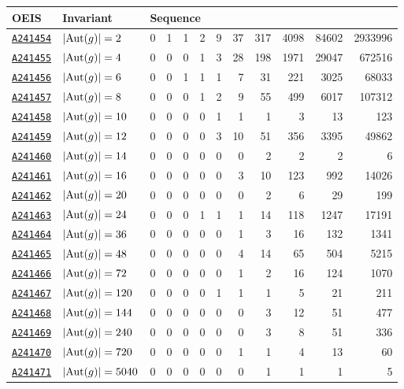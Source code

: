 \documentclass[12pt]{article}
\newcommand{\OEIS}[1]
{\href{https://oeis.org/#1}{\texttt{#1}}}
\begin{document}
\begin{appendices}
\begin{longtable}{ l l r r r r r r r r r r}
\toprule
OEIS & Invariant & \multicolumn{10}{l}{Sequence} \\
\midrule\bottomrule
\OEIS{A241454} & $| \text{Aut}(g) | =2$ & 0 & 1 & 1 & 2 & 9 & 37 & 317 & 4098 & 84602 & 2933996 \\
\OEIS{A241455} & $| \text{Aut}(g) | =4$ & 0 & 0 & 0 & 1 & 3 & 28 & 198 & 1971 & 29047 & 672516 \\
\OEIS{A241456} & $| \text{Aut}(g) | =6$ & 0 & 0 & 1 & 1 & 1 & 7 & 31 & 221 & 3025 & 68033 \\
\OEIS{A241457} & $| \text{Aut}(g) | =8$ & 0 & 0 & 0 & 1 & 2 & 9 & 55 & 499 & 6017 & 107312 \\
\OEIS{A241458} & $| \text{Aut}(g) | =10$ & 0 & 0 & 0 & 0 & 1 & 1 & 1 & 3 & 13 & 123 \\
\OEIS{A241459} & $| \text{Aut}(g) | =12$ & 0 & 0 & 0 & 0 & 3 & 10 & 51 & 356 & 3395 & 49862 \\
\OEIS{A241460} & $| \text{Aut}(g) | =14$ & 0 & 0 & 0 & 0 & 0 & 0 & 2 & 2 & 2 & 6 \\
\OEIS{A241461} & $| \text{Aut}(g) | =16$ & 0 & 0 & 0 & 0 & 0 & 3 & 10 & 123 & 992 & 14026 \\
\OEIS{A241462} & $| \text{Aut}(g) | =20$ & 0 & 0 & 0 & 0 & 0 & 0 & 2 & 6 & 29 & 199 \\
\OEIS{A241463} & $| \text{Aut}(g) | =24$ & 0 & 0 & 0 & 1 & 1 & 1 & 14 & 118 & 1247 & 17191 \\
\OEIS{A241464} & $| \text{Aut}(g) | =36$ & 0 & 0 & 0 & 0 & 0 & 1 & 3 & 16 & 132 & 1341 \\
\OEIS{A241465} & $| \text{Aut}(g) | =48$ & 0 & 0 & 0 & 0 & 0 & 4 & 14 & 65 & 504 & 5215 \\
\OEIS{A241466} & $| \text{Aut}(g) | =72$ & 0 & 0 & 0 & 0 & 0 & 1 & 2 & 16 & 124 & 1070 \\
\OEIS{A241467} & $| \text{Aut}(g) | =120$ & 0 & 0 & 0 & 0 & 1 & 1 & 1 & 5 & 21 & 211 \\
\OEIS{A241468} & $| \text{Aut}(g) | =144$ & 0 & 0 & 0 & 0 & 0 & 0 & 3 & 12 & 51 & 477 \\
\OEIS{A241469} & $| \text{Aut}(g) | =240$ & 0 & 0 & 0 & 0 & 0 & 0 & 3 & 8 & 51 & 336 \\
\OEIS{A241470} & $| \text{Aut}(g) | =720$ & 0 & 0 & 0 & 0 & 0 & 1 & 1 & 4 & 13 & 60 \\
\OEIS{A241471} & $| \text{Aut}(g) | =5040$ & 0 & 0 & 0 & 0 & 0 & 0 & 1 & 1 & 1 & 5 \\

\end{longtable}
\end{appendices}
\end{document}

